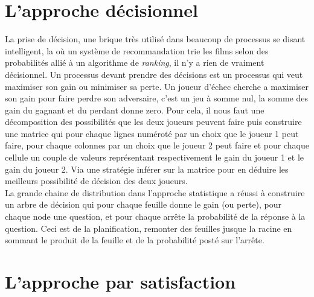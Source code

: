 \section{L'approche décisionnel}

La prise de décision, une brique très utilisé dans beaucoup de processus se disant intelligent, la où un système de recommandation trie les films selon des probabilités allié à un algorithme de \textit{ranking}, il n'y a rien de vraiment décisionnel. Un processus devant prendre des décisions est un processus qui veut maximiser son gain ou minimiser sa perte. Un joueur d'échec cherche a maximiser son gain pour faire perdre son adversaire, c'est un jeu à somme nul, la somme des gain du gagnant et du perdant donne zero. Pour cela, il nous faut une décomposition des possibilités que les deux joueurs peuvent faire puis construire une matrice qui pour chaque lignes numéroté par un choix que le joueur 1 peut faire, pour chaque colonnes par un choix que le joueur 2 peut faire et pour chaque cellule un couple de valeurs représentant respectivement le gain du joueur 1 et le gain du joueur 2. Via une stratégie inférer sur la matrice pour en déduire les meilleurs possibilité de décision des deux joueurs.\\
\linebreak
La grande chaine de distribution dans l'approche statistique a réussi à construire un arbre de décision qui pour chaque feuille donne le gain (ou perte), pour chaque node une question, et pour chaque arrête la probabilité de la réponse à la question. Ceci est de la planification, remonter des feuilles jusque la racine en sommant le produit de la feuille et de la probabilité posté sur l'arrête.\\
\pagebreak

\section{L'approche par satisfaction}